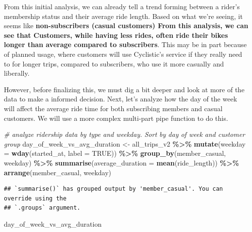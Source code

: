 \documentclass[
]{article}
\newenvironment{Shaded}{\begin{snugshade}}{\end{snugshade}}
\newcommand{\AttributeTok}[1]{\textcolor[rgb]{0.13,0.29,0.53}{#1}}
\newcommand{\CommentTok}[1]{\textcolor[rgb]{0.56,0.35,0.01}{\textit{#1}}}
\newcommand{\ConstantTok}[1]{\textcolor[rgb]{0.56,0.35,0.01}{#1}}
\newcommand{\FunctionTok}[1]{\textcolor[rgb]{0.13,0.29,0.53}{\textbf{#1}}}
\newcommand{\NormalTok}[1]{#1}
\newcommand{\OtherTok}[1]{\textcolor[rgb]{0.56,0.35,0.01}{#1}}
\newcommand{\SpecialCharTok}[1]{\textcolor[rgb]{0.81,0.36,0.00}{\textbf{#1}}}
\begin{document}
From this initial analysis, we can already tell a trend forming between
a rider's membership status and their average ride length. Based on what
we're seeing, it seems like \textbf{non-subscribers (casual customers)
From this analysis, we can see that Customers, while having less rides,
often ride their bikes longer than average compared to subscribers}.
This may be in part because of planned usage, where customers will use
Cyclistic's service if they really need to for longer trips, compared to
subscribers, who use it more casually and liberally.

However, before finalizing this, we must dig a bit deeper and look at
more of the data to make a informed decision. Next, let's analyze how
the day of the week will affect the average ride time for both
subscribing members and casual customers. We will use a more complex
multi-part pipe function to do this.

\begin{Shaded}
\begin{Highlighting}[]
\CommentTok{\# analyze ridership data by type and weekday. Sort by day of week and customer group}
\NormalTok{day\_of\_week\_vs\_avg\_duration }\OtherTok{\textless{}{-}}\NormalTok{ all\_trips\_v2 }\SpecialCharTok{\%\textgreater{}\%}
\FunctionTok{mutate}\NormalTok{(}\AttributeTok{weekday =} \FunctionTok{wday}\NormalTok{(started\_at, }\AttributeTok{label =} \ConstantTok{TRUE}\NormalTok{)) }\SpecialCharTok{\%\textgreater{}\%} 
\FunctionTok{group\_by}\NormalTok{(member\_casual, weekday) }\SpecialCharTok{\%\textgreater{}\%} 
\FunctionTok{summarise}\NormalTok{(}\AttributeTok{average\_duration =} \FunctionTok{mean}\NormalTok{(ride\_length)) }\SpecialCharTok{\%\textgreater{}\%} 
\FunctionTok{arrange}\NormalTok{(member\_casual, weekday)}
\end{Highlighting}
\end{Shaded}

\begin{verbatim}
## `summarise()` has grouped output by 'member_casual'. You can override using the
## `.groups` argument.
\end{verbatim}

\begin{Shaded}
\begin{Highlighting}[]
\NormalTok{day\_of\_week\_vs\_avg\_duration}
\end{Highlighting}
\end{Shaded}
\end{document}
